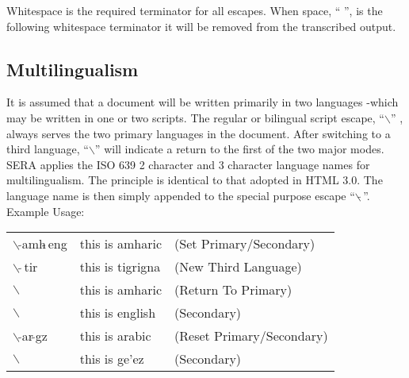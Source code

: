 \noi
Whitespace is the required terminator for all escapes. When space, `` '',
is the following whitespace terminator it will be removed from the transcribed
output. 


\subsection{Multilingualism}


It is assumed that a document will be written primarily in two languages
-which may be written in one or two scripts. The regular or bilingual script 
escape, ``$\backslash$'' , always serves the two primary languages in the 
document. After switching to a third language, ``$\backslash$'' will indicate
a return to the first of the two major modes. \\

SERA applies the ISO 639 2 character and 3 character language names for
multilingualism. The principle is identical to that adopted in HTML 3.0. The 
language name is then simply appended to the special purpose escape 
``$\backslash\tilde{}$\,''. \\  

\noi
Example Usage: \\

\noi
\hspace*{-0.1in}
{\small
\begin{tabular}{lll}
    $\backslash\,\tilde{}$amh$\tilde{}$\,eng   
	                       & this is amharic   & (Set Primary/Secondary)    \\
    $\backslash\,\tilde{}$\,tir & this is tigrigna   & (New Third Language) \\
    $\backslash$           & this is amharic   & (Return To Primary)        \\
    $\backslash$           & this is english   & (Secondary)                \\
    $\backslash\,\tilde{}$ar\,$\tilde{}$gz     
	                       & this is arabic    & ({\footnotesize Reset Primary/Secondary})  \\
    $\backslash$           & this is ge'ez     & (Secondary)              
\end{tabular}   
}
